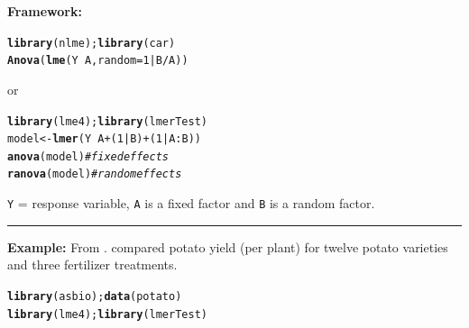 \documentclass[12pt,english]{article}\usepackage[]{graphicx}\usepackage[table]{xcolor}
\makeatletter
\newcommand{\hlnum}[1]{\textcolor[rgb]{0.686,0.059,0.569}{#1}}%
\newcommand{\hlcom}[1]{\textcolor[rgb]{0.678,0.584,0.686}{\textit{#1}}}%
\newcommand{\hlopt}[1]{\textcolor[rgb]{0,0,0}{#1}}%
\newcommand{\hldef}[1]{\textcolor[rgb]{0.345,0.345,0.345}{#1}}%
\newcommand{\hlkwb}[1]{\textcolor[rgb]{0.69,0.353,0.396}{#1}}%
\newcommand{\hlkwc}[1]{\textcolor[rgb]{0.333,0.667,0.333}{#1}}%
\newcommand{\hlkwd}[1]{\textcolor[rgb]{0.737,0.353,0.396}{\textbf{#1}}}%
\newenvironment{kframe}{%
 \def\at@end@of@kframe{}%
 \ifinner\ifhmode%
  \def\at@end@of@kframe{\end{minipage}}%
  \begin{minipage}{\columnwidth}%
 \fi\fi%
 \def\FrameCommand##1{\hskip\@totalleftmargin \hskip-\fboxsep
 \colorbox{shadecolor}{##1}\hskip-\fboxsep
     \hskip-\linewidth \hskip-\@totalleftmargin \hskip\columnwidth}%
 \MakeFramed {\advance\hsize-\width
   \@totalleftmargin\z@ \linewidth\hsize
   \@setminipage}}%
 {\par\unskip\endMakeFramed%
 \at@end@of@kframe}
\newenvironment{knitrout}{}{} %
\makeatother
\begin{document}
\begin{tcolorbox}[colback=yellow!50!red!25!white,colbacktitle=yellow!50!red,colframe=black!75!white,title=\textbf{R:} Two Way Factorial -- One Fixed and One Random Factor]
\textbf{Framework:}\\
\vspace{-.2in}
\begin{knitrout}
\color{fgcolor}\begin{kframe}
\begin{alltt}
\hlkwd{library}\hldef{(nlme);} \hlkwd{library}\hldef{(car)}
\hlkwd{Anova}\hldef{(}\hlkwd{lme}\hldef{(Y} \hlopt{~} \hldef{A,} \hlkwc{random} \hldef{=} \hlnum{1}\hlopt{|}\hldef{B}\hlopt{/}\hldef{A))}
\end{alltt}
\end{kframe}
\end{knitrout}
\vspace{-.1in}
or
\vspace{-.1in}
\begin{knitrout}
\color{fgcolor}\begin{kframe}
\begin{alltt}
\hlkwd{library}\hldef{(lme4);} \hlkwd{library}\hldef{(lmerTest)}
\hldef{model} \hlkwb{<-} \hlkwd{lmer}\hldef{(Y} \hlopt{~} \hldef{A} \hlopt{+} \hldef{(}\hlnum{1}\hlopt{|}\hldef{B)} \hlopt{+} \hldef{(}\hlnum{1}\hlopt{|}\hldef{A}\hlopt{:}\hldef{B))}
\hlkwd{anova}\hldef{(model)} \hlcom{# fixed effects}
\hlkwd{ranova}\hldef{(model)} \hlcom{# random effects}
\end{alltt}
\end{kframe}
\end{knitrout}
\texttt{Y} = response variable, \texttt{A} is a fixed factor and \texttt{B} is a random factor.
\vspace{0.1in}
\par\noindent\rule{.9\textwidth}{0.4pt}
\textbf{Example:} From \citep[][pg 465]{aho2014}.   \citet{fisher1925} compared potato yield (per plant) for twelve potato varieties and three fertilizer treatments.
\vspace{-.1in}
\begin{knitrout}
\color{fgcolor}\begin{kframe}
\begin{alltt}
\hlkwd{library}\hldef{(asbio);} \hlkwd{data}\hldef{(potato)}
\hlkwd{library}\hldef{(lme4);} \hlkwd{library}\hldef{(lmerTest)}


\end{alltt}
\end{kframe}
\end{knitrout}
\end{tcolorbox}
\end{document}
